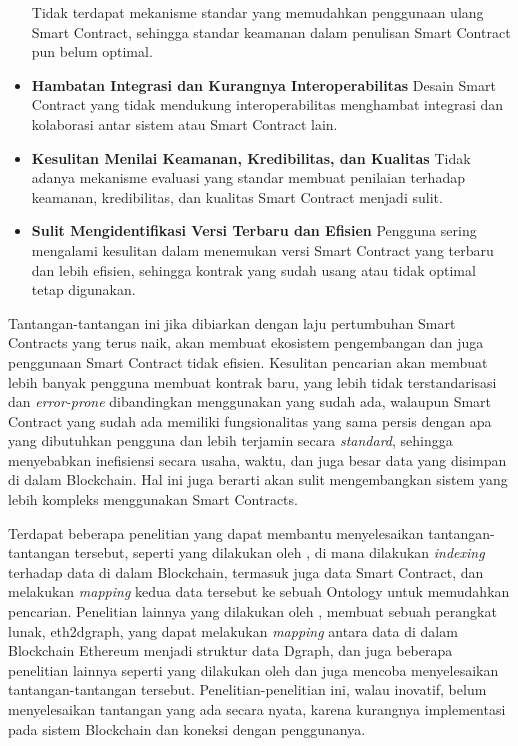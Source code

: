 \begin{itemize}
    Tidak terdapat mekanisme standar yang memudahkan penggunaan ulang Smart Contract, sehingga standar keamanan dalam penulisan Smart Contract pun belum optimal.  
    \item \textbf{Hambatan Integrasi dan Kurangnya Interoperabilitas} \newline
    Desain Smart Contract yang tidak mendukung interoperabilitas menghambat integrasi dan kolaborasi antar sistem atau Smart Contract lain.
    \item \textbf{Kesulitan Menilai Keamanan, Kredibilitas, dan Kualitas} \newline
    Tidak adanya mekanisme evaluasi yang standar membuat penilaian terhadap keamanan, kredibilitas, dan kualitas Smart Contract menjadi sulit.
    \item \textbf{Sulit Mengidentifikasi Versi Terbaru dan Efisien} \newline
    Pengguna sering mengalami kesulitan dalam menemukan versi Smart Contract yang terbaru dan lebih efisien, sehingga kontrak yang sudah usang atau tidak optimal tetap digunakan.
\end{itemize}

Tantangan-tantangan ini jika dibiarkan dengan laju pertumbuhan Smart Contracts yang terus naik, akan membuat ekosistem pengembangan dan juga penggunaan Smart Contract tidak efisien. Kesulitan pencarian akan membuat lebih banyak pengguna membuat kontrak baru, yang lebih tidak terstandarisasi dan \textit{error-prone} dibandingkan menggunakan yang sudah ada, walaupun Smart Contract yang sudah ada memiliki fungsionalitas yang sama persis dengan apa yang dibutuhkan pengguna dan lebih terjamin secara \textit{standard}, sehingga menyebabkan inefisiensi secara usaha, waktu, dan juga besar data yang disimpan di dalam Blockchain. Hal ini juga berarti akan sulit mengembangkan sistem yang lebih kompleks menggunakan Smart Contracts.

Terdapat beberapa penelitian yang dapat membantu menyelesaikan tantangan-tantangan tersebut, seperti yang dilakukan oleh \cite{third2017linked}, di mana dilakukan \textit{indexing} terhadap data di dalam Blockchain, termasuk juga data Smart Contract, dan melakukan \textit{mapping} kedua data tersebut ke sebuah Ontology untuk memudahkan pencarian. Penelitian lainnya yang dilakukan oleh \cite{aimar2023extraction}, membuat sebuah perangkat lunak, eth2dgraph, yang dapat melakukan \textit{mapping} antara data di dalam Blockchain Ethereum menjadi struktur data Dgraph, dan juga beberapa penelitian lainnya seperti yang dilakukan oleh \cite{baqa2019semantic} dan \cite{cano2021toward} juga mencoba menyelesaikan tantangan-tantangan tersebut. Penelitian-penelitian ini, walau inovatif, belum menyelesaikan tantangan yang ada secara nyata, karena kurangnya implementasi pada sistem Blockchain dan koneksi dengan penggunanya. 

